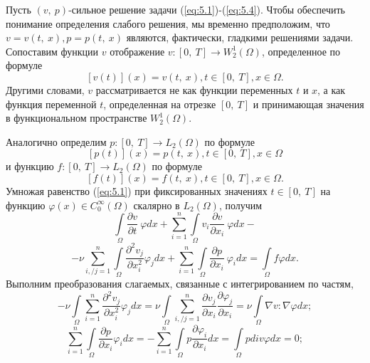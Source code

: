 Пусть $(v, \ p)$-сильное решение задачи (\ref{eq:5.1})-(\ref{eq:5.4}).
Чтобы обеспечить понимание определения слабого решения, мы временно предположим, что $v=v(t, \ x), p=p(t, \ x)$ являются, фактически, гладкими решениями задачи.
Сопоставим функции $v$ отображение $v:[0, \ T]\rightarrow W^1_2(\Omega)$, определенное по формуле $$[v(t)](x)=v(t, \ x), t\in[0, \ T], x\in\Omega.$$
Другими словами, $v$ рассматривается не как функции переменных $t$ и $x$, а как функция переменной $t$, определенная на отрезке
$[0, \ T]$ и принимающая значения в функциональном пространстве $W^1_2(\Omega)$.

Аналогично определим $p:[0, \ T]\rightarrow L_2(\Omega)$ по формуле $$[p(t)](x)=p(t, \ x), t\in[0, \ T], x\in\Omega$$
и функцию $f:[0, \ T]\rightarrow L_2(\Omega)$ по формуле $$[f(t)](x)=f(t, \ x), t\in[0, \ T], x\in\Omega.$$
Умножая равенство (\ref{eq:5.1}) при фиксированных значениях $t\in [0, \ T]$ на функцию $\varphi (x)\in C_0^{\infty}(\Omega)$ скалярно в $L_2(\Omega)$, получим
$$\int\limits_\Omega \frac{\partial v}{\partial t}\ \varphi dx+\sum_{i=1}^n\int\limits_\Omega v_i\frac{\partial v}{\partial x_i}\ \varphi dx-$$
$$-\nu \sum_{i, / j=1}^n\int\limits_\Omega\frac{\partial^2 v_j}{\partial x^{2}_i} \varphi_j dx+
\sum_{i=1}^n\int\limits_\Omega \frac{\partial p}{\partial x_i}\ \varphi_idx=\int\limits_\Omega f\varphi dx.$$
Выполним преобразования слагаемых, связанные с интегрированием по частям,
$$-\nu\int\limits_\Omega \sum_{i=1}^{n}\frac{\partial^2 v_j}{\partial x^{2}_i}\varphi_j dx=
\nu\int\limits_\Omega\sum_{i, / j=1}^{n}\frac{\partial v_j}{\partial x_i}\frac{\partial \varphi_j}{\partial x_i}=\nu\int\limits_\Omega \nabla v:\nabla\varphi dx;$$
$$\sum_{i=1}^{n}\int\limits_\Omega \frac{\partial p}{\partial x_i}\varphi_i dx
=-\sum_{i=1}^{n}\int\limits_\Omega p\frac{\partial \varphi_i}{\partial x_i}dx= \int\limits_\Omega p div\varphi dx=0;$$

